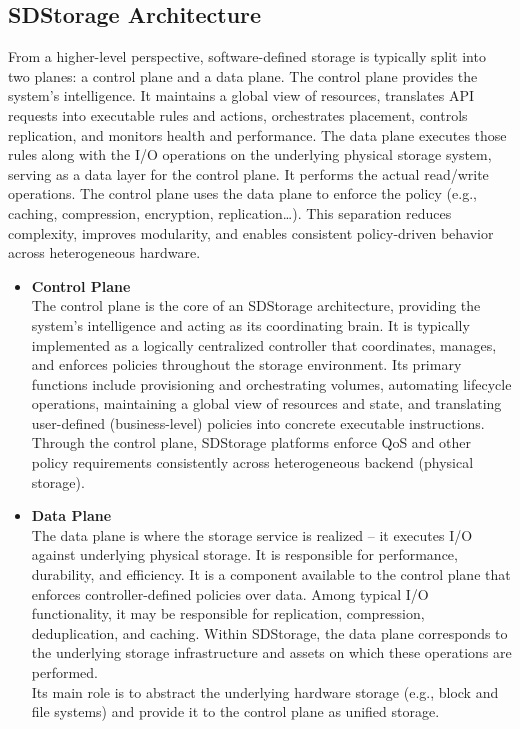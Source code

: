 \subsection{SDStorage Architecture}
From a higher-level perspective, software-defined storage is typically split into two planes: a control plane and a data plane. The control plane provides the system’s intelligence. It maintains a global view of resources, translates API requests into executable rules and actions, orchestrates placement, controls replication, and monitors health and performance. The data plane executes those rules along with the I/O operations on the underlying physical storage system, serving as a data layer for the control plane. It performs the actual read/write operations. The control plane uses the data plane to enforce the policy (e.g., caching, compression, encryption, replication\ldots). This separation reduces complexity, improves modularity, and enables consistent policy-driven behavior across heterogeneous hardware. \cite{moucha_software_2021}

\begin{itemize}
    \item \textbf{Control Plane} \\
    The control plane is the core of an SDStorage architecture, providing the system’s intelligence and acting as its coordinating brain. It is typically implemented as a logically centralized controller that coordinates, manages, and enforces policies throughout the storage environment. Its primary functions include provisioning and orchestrating volumes, automating lifecycle operations, maintaining a global view of resources and state, and translating user-defined (business-level) policies into concrete executable instructions. Through the control plane, SDStorage platforms enforce QoS and other policy requirements consistently across heterogeneous backend (physical storage). \cite{darabseh_sdstorage_2015, macedo_survey_2021, faisal_software-defined_2024}
    \item \textbf{Data Plane} \\
    The data plane is where the storage service is realized -- it executes I/O against underlying physical storage. It is responsible for performance, durability, and efficiency. It is a component available to the control plane that enforces controller-defined policies over data. Among typical I/O functionality, it may be responsible for replication, compression, deduplication, and caching. Within SDStorage, the data plane corresponds to the underlying storage infrastructure and assets on which these operations are performed. \cite{darabseh_sdstorage_2015, macedo_survey_2021, faisal_software-defined_2024} \\
    Its main role is to abstract the underlying hardware storage (e.g., block and file systems) and provide it to the control plane as unified storage.
\end{itemize} 


